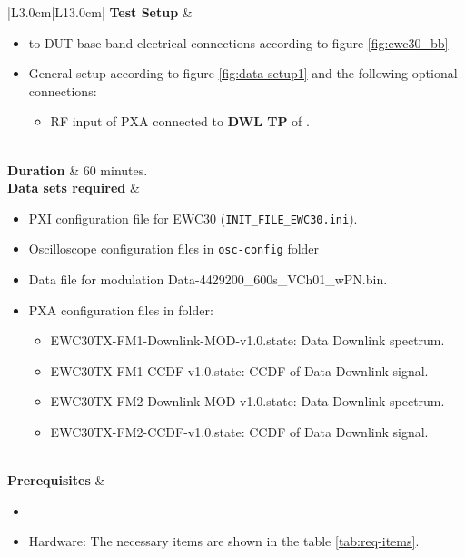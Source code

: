 \begin{table}[H]
\begin{tabular}{|L{3.0cm}|L{13.0cm}|}
	 \textbf{Test Setup} & 
	 \begin{minipage}[t]{\linewidth}
		\begin{itemize}[nosep,after=\strut]
			\item \comEgse{}{} to DUT base-band electrical connections according to figure \ref{fig:ewc30_bb}
			\item General setup according to figure \ref{fig:data-setup1} and the following optional connections:
			\begin{itemize} 
				\item RF input of PXA connected to \textbf{DWL TP} of \comEgse{}. 
			\end{itemize}
		\end{itemize}
		\end{minipage}
	 \\\hline
	 \textbf{Duration} & 60 minutes.\\\hline
	 \textbf{Data sets required} & 
	 \begin{minipage}[t]{\linewidth}
		\begin{itemize}[nosep,after=\strut]
			\item \comEgse{}{} PXI configuration file for EWC30 (\texttt{INIT\_FILE\_EWC30.ini}).
			\item Oscilloscope configuration files in \texttt{osc-config} folder
			\item Data file for modulation Data-4429200\_600s\_VCh01\_wPN.bin.
			\item PXA configuration files in \texttt{\pxaTestFolderName} folder:
				  \begin{itemize}[nosep,after=\strut]
					 \item EWC30TX-FM1-Downlink-MOD-v1.0.state: Data Downlink spectrum.%
					 \item EWC30TX-FM1-CCDF-v1.0.state: CCDF of Data Downlink signal.%
					 \item EWC30TX-FM2-Downlink-MOD-v1.0.state: Data Downlink spectrum.%
					 \item EWC30TX-FM2-CCDF-v1.0.state: CCDF of Data Downlink signal.%
				  \end{itemize}
		\end{itemize}
	\end{minipage}\\\hline
	\textbf{Prerequisites} & 
	\begin{minipage}[t]{\linewidth}
		\begin{itemize}[nosep,after=\strut]
			\item \preReqPro
			\item Hardware: The necessary items are shown in the table \ref{tab:req-items}.
		\end{itemize} 
	\end{minipage}\\\hline
\end{tabular}
	\caption{Procedure \subprocid{} \ description. } \label{tb:dataccdf}
	\end{table}

